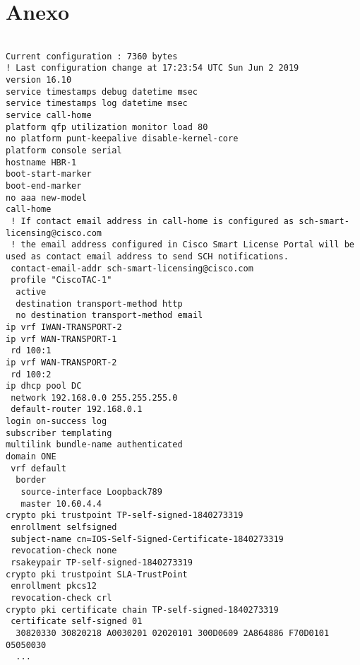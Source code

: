 \chapter{Anexo}
\label{ann:lorem_ipsum1}

\lstset{language=java, caption=HBR1 Configuration, label=lst:YANG}
\begin{lstlisting}

Current configuration : 7360 bytes
! Last configuration change at 17:23:54 UTC Sun Jun 2 2019
version 16.10
service timestamps debug datetime msec
service timestamps log datetime msec
service call-home
platform qfp utilization monitor load 80
no platform punt-keepalive disable-kernel-core
platform console serial
hostname HBR-1
boot-start-marker
boot-end-marker
no aaa new-model
call-home
 ! If contact email address in call-home is configured as sch-smart-licensing@cisco.com
 ! the email address configured in Cisco Smart License Portal will be used as contact email address to send SCH notifications.
 contact-email-addr sch-smart-licensing@cisco.com
 profile "CiscoTAC-1"
  active
  destination transport-method http
  no destination transport-method email
ip vrf IWAN-TRANSPORT-2
ip vrf WAN-TRANSPORT-1
 rd 100:1
ip vrf WAN-TRANSPORT-2
 rd 100:2
ip dhcp pool DC
 network 192.168.0.0 255.255.255.0
 default-router 192.168.0.1
login on-success log
subscriber templating
multilink bundle-name authenticated
domain ONE
 vrf default
  border
   source-interface Loopback789
   master 10.60.4.4
crypto pki trustpoint TP-self-signed-1840273319
 enrollment selfsigned
 subject-name cn=IOS-Self-Signed-Certificate-1840273319
 revocation-check none
 rsakeypair TP-self-signed-1840273319
crypto pki trustpoint SLA-TrustPoint
 enrollment pkcs12
 revocation-check crl
crypto pki certificate chain TP-self-signed-1840273319
 certificate self-signed 01
  30820330 30820218 A0030201 02020101 300D0609 2A864886 F70D0101 05050030
  ...
  

\end{lstlisting}
